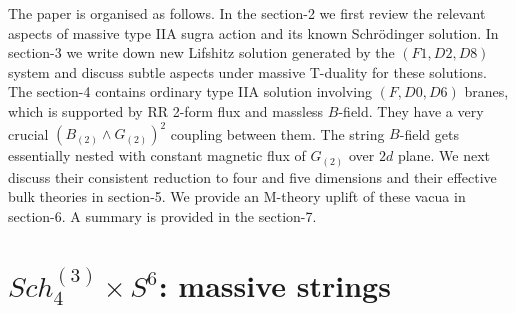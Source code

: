 \documentclass[12pt]{article}
\begin{document}
The paper is organised as follows. In the section-2 we first  review the 
relevant aspects of massive type IIA  sugra action and its known Schr\"odinger
solution. In section-3 we write down new  Lifshitz
solution generated by the $(F1,D2,D8)$ system and 
discuss  subtle aspects under massive T-duality for these solutions. 
The section-4 contains  ordinary type IIA solution involving
$(F,D0,D6)$ branes,
which is supported by RR 2-form flux and massless $B$-field. They 
have a very crucial $(B_{(2)}\wedge G_{(2)})^2$  coupling between them.
The string $B$-field gets essentially nested with constant magnetic 
flux of $G_{(2)}$ over $2d$ plane. 
 We next discuss their consistent  reduction to four and five dimensions 
and their effective bulk
theories in section-5. We provide an M-theory uplift of these 
vacua in section-6. A summary is provided in the section-7.

 
\section{$Sch_4^{(3)}\times S^6$: massive strings }
\end{document}
